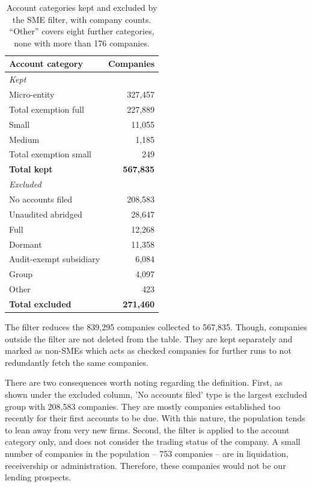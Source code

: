 \documentclass[ %
                    author={Natchalin Iwsakul \\ Inkaphol Siriwongwattana \\ Tanaphan Kummaraphat \\ Patorn Srisupap},
                supervisor={Fernando Moreno-Pino},
                    degree={MSc},
                     title={Propensity Modelling for SME Commercial Lending Using Open Public Data},
                  subtitle={Companies House filings and GDELT media coverage as predictors of first-time borrowing},
                      type={},
                      year={2026}]{dissertation}
\begin{document}
\begin{table}[H]
\centering
\begin{tabular}{lr}
\toprule
Account category & Companies \\
\midrule
\multicolumn{2}{l}{\itshape Kept} \\
Micro-entity             & 327,457 \\
Total exemption full     & 227,889 \\
Small                    &  11,055 \\
Medium                   &   1,185 \\
Total exemption small    &     249 \\
\addlinespace
\textbf{Total kept}      & \textbf{567,835} \\
\midrule
\multicolumn{2}{l}{\itshape Excluded} \\
No accounts filed        & 208,583 \\
Unaudited abridged       &  28,647 \\
Full                     &  12,268 \\
Dormant                  &  11,358 \\
Audit-exempt subsidiary  &   6,084 \\
Group                    &   4,097 \\
Other                    &     423 \\
\addlinespace
\textbf{Total excluded}  & \textbf{271,460} \\
\bottomrule
\end{tabular}
\caption[The SME filter]{Account categories kept and excluded by the SME
filter, with company counts. ``Other'' covers eight further categories, none
with more than 176 companies.}
\label{tab:acctypes}
\end{table}

The filter reduces the 839,295 companies collected to 567,835. Though, companies outside the filter are not deleted from the table. They are kept separately and marked as non-SMEs which acts as checked companies for further runs to not redundantly fetch the same companies.

There are two consequences worth noting regarding the definition. First, as shown under the excluded column, 'No accounts filed' type is the largest excluded group with 208,583 companies. They are mostly companies established too recently for their first accounts to be due. With this nature, the population tends to lean away from very new firms. Second, the filter is applied to the account category only, and does not consider the trading status of the company. A small number of companies in the population -- 753 companies -- are in liquidation, receivership or administration. Therefore, these companies would not be our lending prospects.
\end{document}

